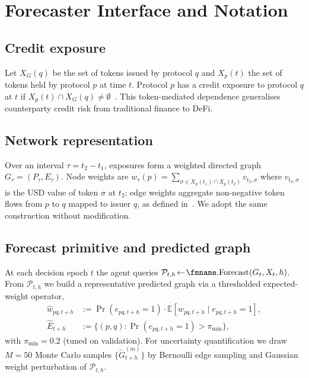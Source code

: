 \section{Forecaster Interface and Notation}
\label{app:fm-notation}

\subsection{Credit exposure}
Let $X_G(q)$ be the set of tokens issued by protocol $q$ and
$X_p(t)$ the set of tokens held by protocol $p$ at time $t$. Protocol
$p$ has a credit exposure to protocol $q$ at $t$ if
$X_p(t)\!\cap\!X_G(q)\!\neq\!\emptyset$~\citep{wu2025dexposuredatasetbenchmarksinterprotocol}.
This token-mediated dependence generalises counterparty credit risk
from traditional finance to DeFi.

\subsection{Network representation}
Over an interval $\tau\!=\!t_2\!-\!t_1$, exposures form a weighted
directed graph $G_\tau\!=\!(P_\tau,E_\tau)$. Node weights are
$w_\tau(p)\!=\!\sum_{\sigma\in X_p(t_1)\cap X_p(t_2)} v_{t_2,\sigma}$
where $v_{t_2,\sigma}$ is the USD value of token $\sigma$ at $t_2$;
edge weights aggregate non-negative token flows from $p$ to $q$
mapped to issuer $q$, as defined
in~\citet{wu2025dexposuredatasetbenchmarksinterprotocol}. We adopt
the same construction without modification.

\subsection{Forecast primitive and predicted graph}
At each decision epoch $t$ the agent queries
$\mathcal{P}_{t,h}\!\leftarrow\!\text{\fmname.Forecast}(G_t,X_t,h)$.
From $\mathcal{P}_{t,h}$ we build a representative predicted graph
via a thresholded expected-weight operator,
\begin{align}
\widehat{w}_{pq,t+h} &:= \Pr(e_{pq,t+h}\!=\!1)\cdot
                        \mathbb{E}[w_{pq,t+h}\mid e_{pq,t+h}\!=\!1],
\label{eq:expected-graph} \\
\widehat{E}_{t+h}    &:= \{(p,q) : \Pr(e_{pq,t+h}\!=\!1) > \pi_{\min}\},
\end{align}
with $\pi_{\min}\!=\!0.2$ (tuned on validation). For uncertainty
quantification we draw $M\!=\!50$ Monte Carlo samples
$\{\widetilde{G}^{(m)}_{t+h}\}$ by Bernoulli edge sampling and
Gaussian weight perturbation of $\mathcal{P}_{t,h}$.

